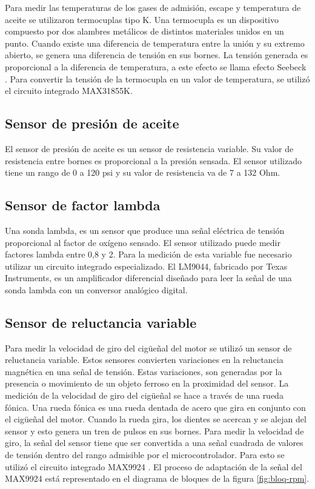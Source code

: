 Para medir las temperaturas de los gases de admisión, escape y temperatura de aceite se utilizaron termocuplas tipo K. Una termocupla es un dispositivo compuesto por dos alambres metálicos de distintos materiales unidos en un punto. Cuando existe una diferencia de temperatura entre la unión y su extremo abierto, se genera una diferencia de tensión en sus bornes. La tensión generada es proporcional a la diferencia de temperatura, a este efecto se llama efecto Seebeck \cite{termocupla}. Para convertir la tensión de la termocupla en un valor de temperatura, se utilizó el circuito integrado MAX31855K.

\subsection{Sensor de presión de aceite}

El sensor de presión de aceite es un sensor de resistencia variable. Su valor de resistencia entre bornes es proporcional a la presión sensada. El sensor utilizado tiene un rango de 0 a 120 psi y su valor de resistencia va de 7 a 132 Ohm.

\subsection{Sensor de factor lambda}

Una sonda lambda, es un sensor que produce una señal eléctrica de tensión proporcional al factor de oxígeno sensado. El sensor utilizado puede medir factores lambda entre 0,8 y 2. Para la medición de esta variable fue necesario utilizar un circuito integrado especializado. El LM9044, fabricado por Texas Instruments, es un amplificador diferencial diseñado para leer la señal de una sonda lambda con un conversor analógico digital.

\subsection{Sensor de reluctancia variable}

Para medir la velocidad de giro del cigüeñal del motor se utilizó un sensor de reluctancia variable. Estos sensores convierten variaciones en la reluctancia magnética en una señal de tensión. Estas variaciones, son generadas por la presencia o movimiento de un objeto ferroso en la proximidad del sensor. La medición de la velocidad de giro del cigüeñal se hace a través de una rueda fónica. Una rueda fónica es una rueda dentada de acero que gira en conjunto con el cigüeñal del motor. Cuando la rueda gira, los dientes se acercan y se alejan del sensor y esto genera un tren de pulsos en sus bornes. Para medir la velocidad de giro, la señal del sensor tiene que ser convertida a una señal cuadrada de valores de tensión dentro del rango admisible por el microcontrolador. Para esto se utilizó el circuito integrado MAX9924 \cite{MAX9924}. El proceso de adaptación de la señal del MAX9924 está representado en el diagrama de bloques de la figura \ref{fig:bloq-rpm}.

